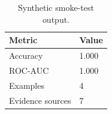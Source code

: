 \begin{table}
\caption{Synthetic smoke-test output.}
\label{tab:smoke}
\begin{tabular}{ll}
\toprule
Metric & Value \\
\midrule
Accuracy & 1.000 \\
ROC-AUC & 1.000 \\
Examples & 4 \\
Evidence sources & 7 \\
\bottomrule
\end{tabular}
\end{table}
